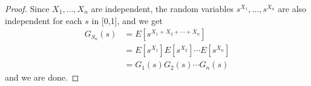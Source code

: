\begin{proof}
  Since $X_1, \ldots, X_n$ are independent, the random variables $s^{X_1}, \ldots, s^{X_n}$ are also independent for each $s$ in [0,1], and we get
  \begin{align*}
    G_{S_n}(s) &= E[s^{X_1 + X_2 + \cdots + X_n}]\\
    &= E[s^{X_1}]E[s^{X_2}] \cdots E[s^{X_n}]\\
    &= G_1(s)G_2(s) \cdots G_n(s)
  \end{align*}
  and we are done.
\end{proof}
